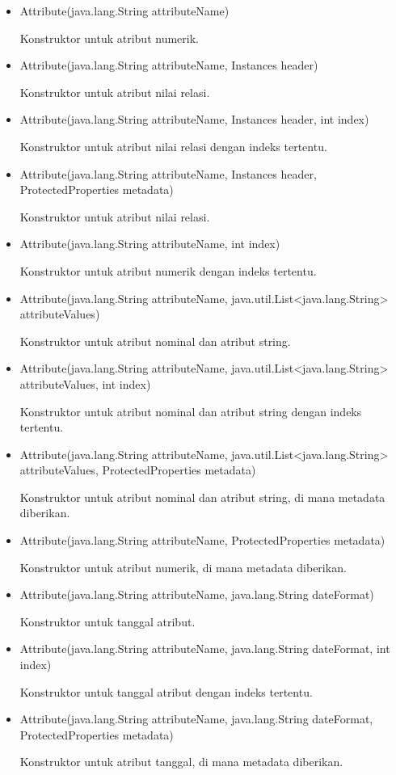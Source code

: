 \begin{itemize}
	\item Attribute(java.lang.String attributeName)
	
	Konstruktor untuk atribut numerik.
	
	\item Attribute(java.lang.String attributeName, Instances header)
	
	Konstruktor untuk atribut nilai relasi.
	
	\item Attribute(java.lang.String attributeName, Instances header, int index)
	
	Konstruktor untuk atribut nilai relasi dengan indeks tertentu.
	
	\item Attribute(java.lang.String attributeName, Instances header, ProtectedProperties metadata)
	
	Konstruktor untuk atribut nilai relasi.
	
	\item Attribute(java.lang.String attributeName, int index)
	
	Konstruktor untuk atribut numerik dengan indeks tertentu.
	
	\item Attribute(java.lang.String attributeName, java.util.List<java.lang.String> attributeValues)
	
	Konstruktor untuk atribut nominal dan atribut string.
	
	\item Attribute(java.lang.String attributeName, java.util.List<java.lang.String> attributeValues, int index)
	
	Konstruktor untuk atribut nominal dan atribut string dengan indeks tertentu.
	
	\item Attribute(java.lang.String attributeName, java.util.List<java.lang.String> attributeValues, ProtectedProperties metadata)
	
	Konstruktor untuk atribut nominal dan atribut string, di mana metadata diberikan.
	
	\item Attribute(java.lang.String attributeName, ProtectedProperties metadata)
	
	Konstruktor untuk atribut numerik, di mana metadata diberikan.
	
	\item Attribute(java.lang.String attributeName, java.lang.String dateFormat)
	
	Konstruktor untuk tanggal atribut.
	
	\item Attribute(java.lang.String attributeName, java.lang.String dateFormat, int index)
	
	Konstruktor untuk tanggal atribut dengan indeks tertentu.
	
	\item Attribute(java.lang.String attributeName, java.lang.String dateFormat, ProtectedProperties metadata)
	
	Konstruktor untuk atribut tanggal, di mana metadata diberikan.
\end{itemize}
